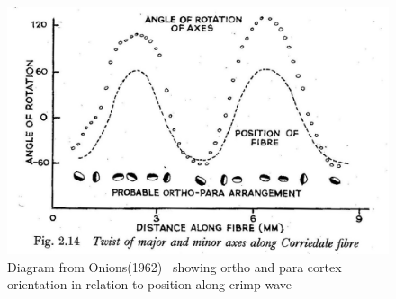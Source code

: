 %

\begin{figure}[!h]
  \centering
  \includegraphics[width=1.1\textwidth]{fig3rot.jpg}
  \caption{Diagram from Onions(1962)~\cite{onio:62} showing ortho and para
     cortex orientation in relation to position along crimp wave}
  \label{fig:3}
\end{figure}

%

